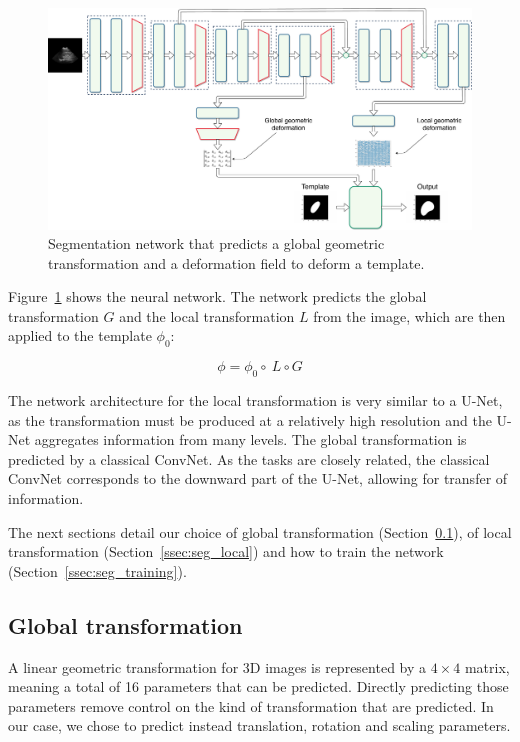 \begin{figure}[htbp]
	\includegraphics[width=\textwidth]{img_seg/deformation_network}
    \caption{Segmentation network that predicts a global geometric transformation and a deformation field to deform a template.}
    \label{fig:deform_network}
\end{figure}

Figure~\ref{fig:deform_network} shows the neural network. The network predicts the global transformation $G$ and the local transformation $L$ from the image, which are then applied to the template $\phi_0$:

\begin{equation}
    \phi = \phi_0 \circ \ L \circ G
\end{equation}

The network architecture for the local transformation is very similar to a U-Net, as the transformation must be produced at a relatively high resolution and the U-Net aggregates information from many levels. The global transformation is predicted by a classical ConvNet. As the tasks are closely related, the classical ConvNet corresponds to the downward part of the U-Net, allowing for transfer of information.

The next sections detail our choice of global transformation (Section~\ref{ssec:seg_global}), of local transformation (Section~\ref{ssec:seg_local}) and how to train the network (Section~\ref{ssec:seg_training}).

\subsection{Global transformation}
\label{ssec:seg_global}

A linear geometric transformation for 3D images is represented by a $4 \times 4$ matrix, meaning a total of 16 parameters that can be predicted. Directly predicting those parameters remove control on the kind of transformation that are predicted. In our case, we chose to predict instead translation, rotation and scaling parameters. 

